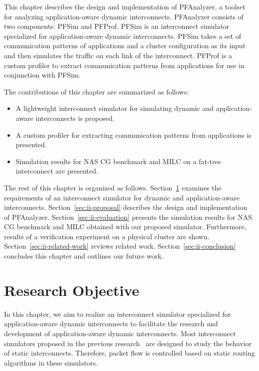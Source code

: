 This chapter describes the design and implementation of PFAnalyzer, a
toolset for analyzing application-aware dynamic interconnects.
PFAnalyzer consists of two components: PFSim and PFProf. PFSim is an
interconnect simulator specialized for application-aware dynamic
interconnects. PFSim takes a set of communication patterns of
applications and a cluster configuration as its input and then simulates
the traffic on each link of the interconnect. PFProf is a custom
profiler to extract communication patterns from applications for use in
conjunction with PFSim.

The contributions of this chapter are summarized as follows:

\begin{itemize}
\item
  A lightweight interconnect simulator for simulating dynamic and
  application-aware interconnects is proposed.
\item
  A custom profiler for extracting communication patterns from
  applications is presented.
\item
  Simulation results for NAS CG benchmark and MILC on a fat-tree
  interconnect are presented.
\end{itemize}

The rest of this chapter is organized as follows.
Section~\ref{sec:ii-objective} examines the requirements of an
interconnect simulator for dynamic and application-aware interconnects.
Section~\ref{sec:ii-proposal}
describes the design and implementation of PFAnalyzer.
Section~\ref{sec:ii-evaluation} presents the simulation results for NAS CG
benchmark and MILC obtained with our proposed simulator. Furthermore,
results of a verification experiment on a physical cluster are shown.
Section~\ref{sec:ii-related-work} reviews related work.
Section~\ref{sec:ii-conclusion} concludes this chapter and outlines our future
work.

\section{Research Objective}\label{sec:ii-objective}

In this chapter, we aim to realize an interconnect simulator specialized
for application-aware dynamic interconnects to facilitate the research
and development of application-aware dynamic interconnects. Most
interconnect simulators proposed in the previous
research~\autocites{Schneider2009}{Tikir2009}{Hoefler2010}{Jo2015} are
designed to study the behavior of static interconnects. Therefore,
packet flow is controlled based on static routing algorithms in these
simulators.

